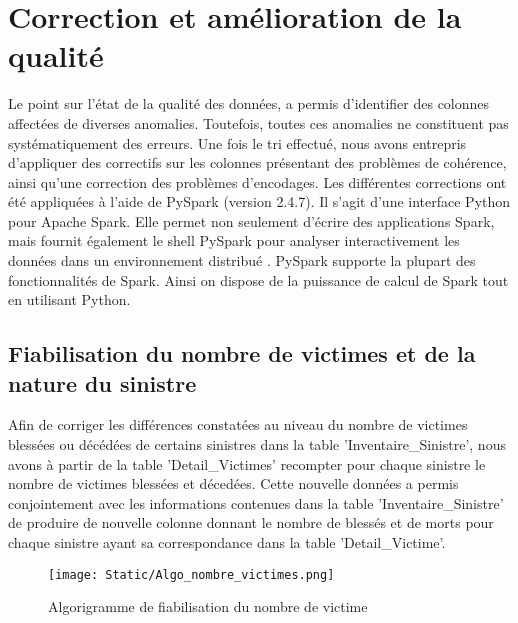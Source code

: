 \section{Correction et am\'elioration de la qualit\'e}
Le point sur l'\'etat de la qualit\'e des donn\'ees, a permis d'identifier des colonnes affect\'ees de diverses anomalies. Toutefois, toutes ces anomalies ne constituent pas syst\'ematiquement des erreurs. Une fois le tri effectu\'e, nous avons entrepris d'appliquer des correctifs sur les colonnes pr\'esentant des probl\`emes de coh\'erence, ainsi qu'une correction des probl\`emes d'encodages. Les diff\'erentes corrections ont \'et\'e appliqu\'ees \`a l'aide de PySpark (version 2.4.7). Il s'agit d'une interface Python pour Apache Spark. Elle permet non seulement d'\'ecrire des applications Spark, mais fournit également le shell PySpark pour analyser interactivement les données dans un environnement distribué \cite{PySpark}. PySpark supporte la plupart des fonctionnalités de Spark. Ainsi on dispose de la puissance de calcul de Spark tout en utilisant Python. 

\subsection{Fiabilisation du nombre de victimes et de la nature du sinistre}
Afin de corriger les diff\'erences constat\'ees au niveau du nombre de victimes bless\'ees ou d\'ec\'ed\'ees de certains sinistres dans la table 'Inventaire\_Sinistre', nous avons \`a partir de la table 'Detail\_Victimes' recompter pour chaque sinistre le nombre de victimes bless\'ees et d\'eced\'ees. Cette nouvelle donn\'ees a permis conjointement avec les informations contenues dans la table 'Inventaire\_Sinistre' de produire de nouvelle colonne donnant le nombre de bless\'es et de morts pour chaque sinistre ayant sa correspondance dans la table 'Detail\_Victime'.\\
\begin{figure}[!h]
    \begin{center}
      \texttt{[image: Static/Algo\_nombre\_victimes.png]} 
      \end{center}
        \caption{Algorigramme de fiabilisation du nombre de victime}  \label{fig:xray}
\end{figure}

